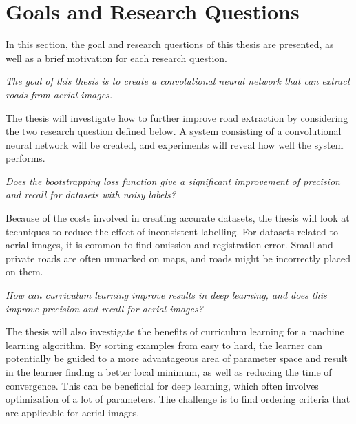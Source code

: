 \section{Goals and Research Questions}
\label{sec:Goals and Research Questions}
In this section, the goal and research questions of this thesis are presented, as well as a brief motivation for each research question.

\begin{description}[ style=nextline, leftmargin=1.5em, rightmargin=1.5em]
\item[Goal statement:]{\it The goal of this thesis is to create a convolutional neural network that can extract roads from aerial images.}
\end{description}

The thesis will investigate how to further improve road extraction by considering the two research question defined below. A system consisting of a convolutional neural network will be created, and experiments will reveal how well the system performs.

\begin{description}[ style=nextline, leftmargin=1.5em, rightmargin=1.5em]
\item[Research question 1:]{\it Does the bootstrapping loss function give a significant improvement of precision and recall for datasets with noisy labels?}
\end{description}

Because of the costs involved in creating accurate datasets, the thesis will look at techniques to reduce the effect of inconsistent labelling. For datasets related to aerial images, it is common to find omission and registration error. Small and private roads are often unmarked on maps, and roads might be incorrectly placed on them.

\begin{description}[ style=nextline, leftmargin=1.5em, rightmargin=1.5em]
\item[Research question 2:]{\it How can curriculum learning improve results in deep learning, and does this improve precision and recall for aerial images?}
\end{description}

The thesis will also investigate the benefits of curriculum learning for a machine learning algorithm. By sorting examples from easy to hard, the learner can potentially be guided to a more advantageous area of parameter space and result in the learner finding a better local minimum, as well as reducing the time of convergence. This can be beneficial for deep learning, which often involves optimization of a lot of parameters. The challenge is to find ordering criteria that are applicable for aerial images. 
